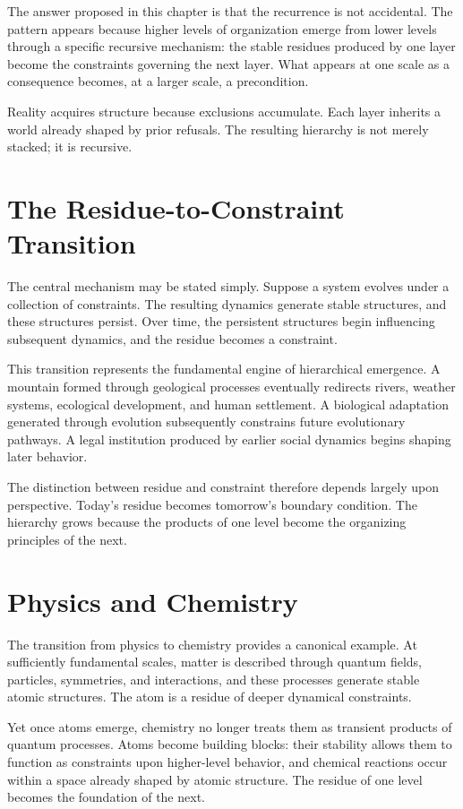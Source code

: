 \documentclass[11pt,oneside]{book}
\theoremstyle{plain}
\theoremstyle{definition}
\theoremstyle{remark}
\begin{document}
The answer proposed in this chapter is that the recurrence is not accidental. The pattern appears because higher levels of organization emerge from lower levels through a specific recursive mechanism: the stable residues produced by one layer become the constraints governing the next layer. What appears at one scale as a consequence becomes, at a larger scale, a precondition.

Reality acquires structure because exclusions accumulate. Each layer inherits a world already shaped by prior refusals. The resulting hierarchy is not merely stacked; it is recursive.

\section{The Residue-to-Constraint Transition}

The central mechanism may be stated simply. Suppose a system evolves under a collection of constraints. The resulting dynamics generate stable structures, and these structures persist. Over time, the persistent structures begin influencing subsequent dynamics, and the residue becomes a constraint.

This transition represents the fundamental engine of hierarchical emergence. A mountain formed through geological processes eventually redirects rivers, weather systems, ecological development, and human settlement. A biological adaptation generated through evolution subsequently constrains future evolutionary pathways. A legal institution produced by earlier social dynamics begins shaping later behavior.

The distinction between residue and constraint therefore depends largely upon perspective. Today's residue becomes tomorrow's boundary condition. The hierarchy grows because the products of one level become the organizing principles of the next.

\section{Physics and Chemistry}

The transition from physics to chemistry provides a canonical example. At sufficiently fundamental scales, matter is described through quantum fields, particles, symmetries, and interactions, and these processes generate stable atomic structures. The atom is a residue of deeper dynamical constraints.

Yet once atoms emerge, chemistry no longer treats them as transient products of quantum processes. Atoms become building blocks: their stability allows them to function as constraints upon higher-level behavior, and chemical reactions occur within a space already shaped by atomic structure. The residue of one level becomes the foundation of the next.
\end{document}
